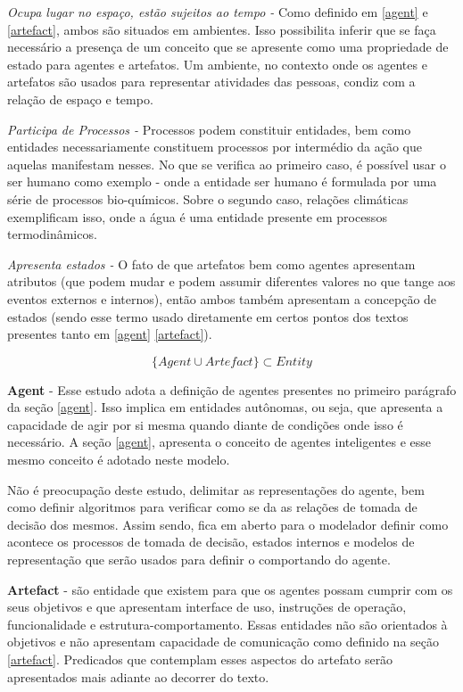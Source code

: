 \textit{Ocupa lugar no espaço, estão sujeitos ao tempo - } Como definido em \ref{agent} e \ref{artefact}, ambos são situados em ambientes. 
Isso possibilita inferir que se faça necessário a presença de um conceito que se apresente como uma propriedade de estado para agentes e artefatos. Um ambiente, no contexto onde os agentes e artefatos são usados para representar atividades das pessoas, condiz com a relação de espaço e tempo. 

\textit{Participa de Processos -} Processos podem constituir entidades, bem como entidades necessariamente constituem processos por intermédio da ação que aquelas manifestam nesses. No que se verifica ao primeiro caso, é possível usar o ser humano como exemplo - onde
a entidade ser humano é formulada por uma série de processos bio-químicos. Sobre o segundo caso, relações climáticas exemplificam isso, onde a água é uma entidade presente em processos termodinâmicos. 

\textit{Apresenta estados -} O fato de que artefatos bem como agentes apresentam atributos (que podem mudar e podem assumir diferentes valores no que tange aos eventos externos e internos), então ambos também apresentam a concepção de estados (sendo esse termo usado diretamente em certos pontos dos textos presentes tanto em \ref{agent} \ref{artefact}). 


\begin{equation} \label{defineentity} 
 \{ Agent \cup Artefact \} \subset Entity
\end{equation}

\textbf{Agent} - Esse estudo adota a definição de agentes presentes no primeiro parágrafo da seção \ref{agent}. Isso implica em entidades autônomas, ou seja, que apresenta a capacidade de agir por si mesma quando diante de condições onde isso é necessário. A seção \ref{agent}, apresenta o conceito de agentes inteligentes e esse mesmo conceito é adotado neste modelo. 

Não é preocupação deste estudo, delimitar as representações do agente, bem como definir algoritmos para verificar como se da as relações de tomada de decisão dos mesmos. Assim sendo, fica em aberto para o modelador definir como acontece os processos de tomada de decisão, estados internos e modelos de representação que serão usados para definir o comportando do agente. 

\textbf{Artefact} - são entidade que existem para que os agentes possam cumprir com os seus objetivos e que apresentam interface de uso, instruções de operação, funcionalidade e estrutura-comportamento. Essas entidades não são orientados à objetivos e 
não apresentam capacidade de comunicação como definido na seção \ref{artefact}. Predicados que contemplam esses aspectos do artefato serão apresentados mais adiante ao decorrer do texto. 

